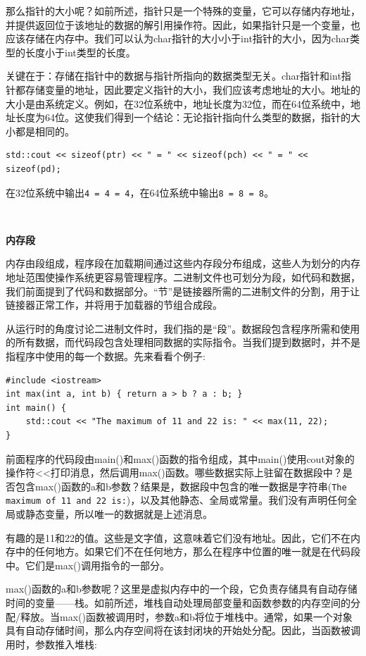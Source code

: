 那么指针的大小呢？如前所述，指针只是一个特殊的变量，它可以存储内存地址，并提供返回位于该地址的数据的解引用操作符。因此，如果指针只是一个变量，也应该存储在内存中。我们可以认为char指针的大小小于int指针的大小，因为char类型的长度小于int类型的长度。 \par
关键在于：存储在指针中的数据与指针所指向的数据类型无关。char指针和int指针都存储变量的地址，因此要定义指针的大小，我们应该考虑地址的大小。地址的大小是由系统定义。例如，在32位系统中，地址长度为32位，而在64位系统中，地址长度为64位。这使我们得到一个结论：无论指针指向什么类型的数据，指针的大小都是相同的。\par

\begin{lstlisting}[caption={}]
std::cout << sizeof(ptr) << " = " << sizeof(pch) << " = " << sizeof(pd);
\end{lstlisting}

在32位系统中输出\texttt{4 = 4 = 4}，在64位系统中输出\texttt{8 = 8 = 8}。 \par

\noindent\textbf{}\ \par
\textbf{内存段} \ \par
内存由段组成，程序段在加载期间通过这些内存段分布组成，这些人为划分的内存地址范围使操作系统更容易管理程序。二进制文件也可划分为段，如代码和数据，我们前面提到了代码和数据部分。“节”是链接器所需的二进制文件的分割，用于让链接器正常工作，并将用于加载器的节组合成段。 \par
从运行时的角度讨论二进制文件时，我们指的是“段”。数据段包含程序所需和使用的所有数据，而代码段包含处理相同数据的实际指令。当我们提到数据时，并不是指程序中使用的每一个数据。先来看看个例子: \par

\begin{lstlisting}[caption={}]
#include <iostream>
int max(int a, int b) { return a > b ? a : b; }
int main() {
	std::cout << "The maximum of 11 and 22 is: " << max(11, 22);
}
\end{lstlisting}

前面程序的代码段由main()和max()函数的指令组成，其中main()使用cout对象的操作符<<打印消息，然后调用max()函数。哪些数据实际上驻留在数据段中？是否包含max()函数的a和b参数？结果是，数据段中包含的唯一数据是字符串(\texttt{The maximum of 11 and 22 is:})，以及其他静态、全局或常量。我们没有声明任何全局或静态变量，所以唯一的数据就是上述消息。\par
有趣的是11和22的值。这些是文字值，这意味着它们没有地址。因此，它们不在内存中的任何地方。如果它们不在任何地方，那么在程序中位置的唯一就是在代码段中。它们是max()调用指令的一部分。\par
max()函数的a和b参数呢？这里是虚拟内存中的一个段，它负责存储具有自动存储时间的变量——栈。如前所述，堆栈自动处理局部变量和函数参数的内存空间的分配/释放。当max()函数被调用时，参数a和b将位于堆栈中。通常，如果一个对象具有自动存储时间，那么内存空间将在该封闭块的开始处分配。因此，当函数被调用时，参数推入堆栈: \par

